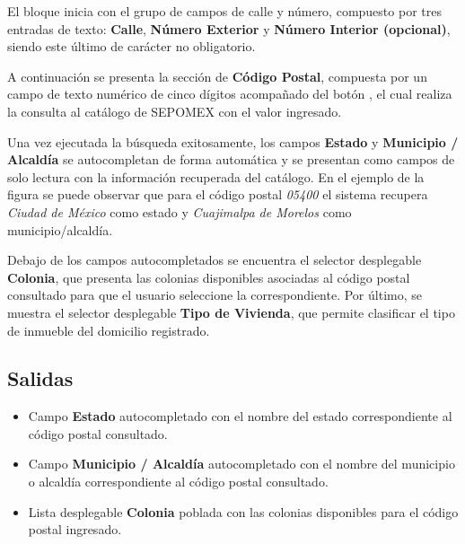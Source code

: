 El bloque inicia con el grupo de campos de calle y número, compuesto por tres 
entradas de texto: \textbf{Calle}, \textbf{Número Exterior} y 
\textbf{Número Interior (opcional)}, siendo este último de carácter no 
obligatorio.

A continuación se presenta la sección de \textbf{Código Postal}, compuesta por 
un campo de texto numérico de cinco dígitos acompañado del botón 
, el cual realiza la consulta al catálogo de SEPOMEX con el 
valor ingresado.

Una vez ejecutada la búsqueda exitosamente, los campos \textbf{Estado} y 
\textbf{Municipio / Alcaldía} se autocompletan de forma automática y se 
presentan como campos de solo lectura con la información recuperada del 
catálogo. En el ejemplo de la figura se puede observar que para el código postal 
\textit{05400} el sistema recupera \textit{Ciudad de México} como estado y 
\textit{Cuajimalpa de Morelos} como municipio/alcaldía.

Debajo de los campos autocompletados se encuentra el selector desplegable 
\textbf{Colonia}, que presenta las colonias disponibles asociadas al código 
postal consultado para que el usuario seleccione la correspondiente. Por último, 
se muestra el selector desplegable \textbf{Tipo de Vivienda}, que permite 
clasificar el tipo de inmueble del domicilio registrado.


\subsection{Salidas}
\begin{itemize}
	\item Campo \textbf{Estado} autocompletado con el nombre del estado 
	correspondiente al código postal consultado.
	\item Campo \textbf{Municipio / Alcaldía} autocompletado con el nombre del 
	municipio o alcaldía correspondiente al código postal consultado.
	\item Lista desplegable \textbf{Colonia} poblada con las colonias disponibles 
	para el código postal ingresado.
\end{itemize}

